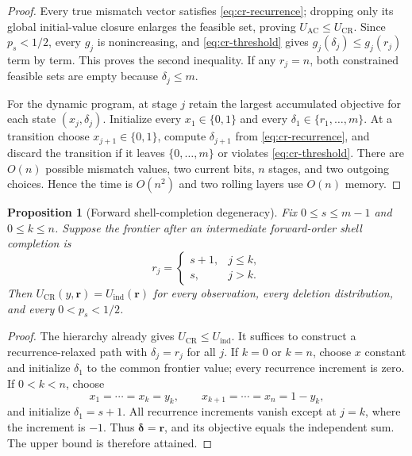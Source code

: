 \documentclass[11pt]{article}
\newtheorem{proposition}[theorem]{Proposition}
\theoremstyle{remark}
\begin{document}
\begin{proof}
Every true mismatch vector satisfies \eqref{eq:cr-recurrence}; dropping only its global
initial-value closure enlarges the feasible set, proving
$U_{\mathrm{AC}}\le U_{\mathrm{CR}}$. Since $p_s<1/2$, every $g_j$ is nonincreasing,
and \eqref{eq:cr-threshold} gives $g_j(\delta_j)\le g_j(r_j)$ term by term. This proves
the second inequality. If any $r_j=n$, both constrained feasible sets are empty because
$\delta_j\le m$.

For the dynamic program, at stage $j$ retain the largest accumulated objective for each
state $(x_j,\delta_j)$. Initialize every $x_1\in\{0,1\}$ and every
$\delta_1\in\{r_1,\ldots,m\}$. At a transition choose $x_{j+1}\in\{0,1\}$, compute
$\delta_{j+1}$ from \eqref{eq:cr-recurrence}, and discard the transition if it leaves
$\{0,\ldots,m\}$ or violates \eqref{eq:cr-threshold}. There are $O(n)$ possible mismatch
values, two current bits, $n$ stages, and two outgoing choices. Hence the time is
$O(n^2)$ and two rolling layers use $O(n)$ memory.
\end{proof}

\begin{proposition}[Forward shell-completion degeneracy]
Fix $0\le s\le m-1$ and $0\le k\le n$. Suppose the frontier after an intermediate
forward-order shell completion is
\[
 r_j=\begin{cases}s+1,&j\le k,\\s,&j>k.\end{cases}
\]
Then $U_{\mathrm{CR}}(y,\mathbf r)=U_{\mathrm{ind}}(\mathbf r)$ for every observation,
every deletion distribution, and every $0<p_s<1/2$.
\end{proposition}

\begin{proof}
The hierarchy already gives $U_{\mathrm{CR}}\le U_{\mathrm{ind}}$. It suffices to
construct a recurrence-relaxed path with $\delta_j=r_j$ for all $j$. If $k=0$ or $k=n$,
choose $x$ constant and initialize $\delta_1$ to the common frontier value; every
recurrence increment is zero. If $0<k<n$, choose
\[
 x_1=\cdots=x_k=y_k,\qquad
 x_{k+1}=\cdots=x_n=1-y_k,
\]
and initialize $\delta_1=s+1$. All recurrence increments vanish except at $j=k$, where
the increment is $-1$. Thus $\boldsymbol\delta=\mathbf r$, and its objective equals the
independent sum. The upper bound is therefore attained.
\end{proof}
\end{document}
